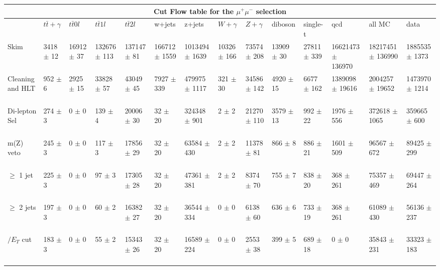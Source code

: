 \begin{table}
  \centering 
\resizebox{\columnwidth}{!} {

\begin{tabular}{|l|l|l|l|l|l|l|l|l|l|l|l|l|l|}
\hline
\multicolumn{14}{|c|}{\textbf{Cut Flow table for the $\mu^+\mu^-$ selection}} \\
\hline
 & $t\bar{t}+\gamma$ & $t\bar{t} 0l$ & $t\bar{t} 1l$ & $t\bar{t} 2l$ & w+jets & z+jets & $W+\gamma$ & $Z+\gamma$ & diboson & single-t & qcd & all MC & data \\
 \hline
Skim & 3418 $\pm$ 12 \ & 16912 $\pm$ 37 \ & 132676 $\pm$ 113 \ & 137147 $\pm$ 81 \ & 166712 $\pm$ 1559 \ & 1013494 $\pm$ 1639 \ & 10326 $\pm$ 166 \ & 73574 $\pm$ 208 \ & 13909 $\pm$ 30 \ & 27811 $\pm$ 339 \ & 16621473 $\pm$ 136970\ & 18217451 $\pm$ 136990 \ & 1885535 $\pm$ 1373 \\
Cleaning and HLT & 952 $\pm$ 6 \ & 2925 $\pm$ 15 \ & 33828 $\pm$ 57 \ & 43049 $\pm$ 45 \ & 7927 $\pm$ 339 \ & 479975 $\pm$ 1117 \ & 321 $\pm$ 30 \ & 34586 $\pm$ 142 \ & 4920 $\pm$ 15 \ & 6677 $\pm$ 162 \ & 1389098 $\pm$ 19616\ & 2004257 $\pm$ 19652 \ & 1473970 $\pm$ 1214 \\
Di-lepton Sel & 274 $\pm$ 3 \ & 0 $\pm$ 0 \ & 139 $\pm$ 4 \ & 20006 $\pm$ 30 \ & 32 $\pm$ 20 \ & 324348 $\pm$ 901 \ & 2 $\pm$ 2 \ & 21270 $\pm$ 110 \ & 3579 $\pm$ 13 \ & 992 $\pm$ 22 \ & 1976 $\pm$ 556\ & 372618 $\pm$ 1065 \ & 359665 $\pm$ 600 \\
m(Z) veto & 245 $\pm$ 3 \ & 0 $\pm$ 0 \ & 117 $\pm$ 3 \ & 17856 $\pm$ 29 \ & 32 $\pm$ 20 \ & 63584 $\pm$ 430 \ & 2 $\pm$ 2 \ & 11378 $\pm$ 81 \ & 866 $\pm$ 8 \ & 886 $\pm$ 21 \ & 1601 $\pm$ 509\ & 96567 $\pm$ 672 \ & 89425 $\pm$ 299 \\
$\geq$ 1 jet & 225 $\pm$ 3 \ & 0 $\pm$ 0 \ & 97 $\pm$ 3 \ & 17305 $\pm$ 28 \ & 32 $\pm$ 20 \ & 47361 $\pm$ 381 \ & 2 $\pm$ 2 \ & 8374 $\pm$ 70 \ & 755 $\pm$ 7 \ & 838 $\pm$ 20 \ & 368 $\pm$ 261\ & 75357 $\pm$ 469 \ & 69447 $\pm$ 264 \\
$\geq$ 2 jets & 197 $\pm$ 3 \ & 0 $\pm$ 0 \ & 60 $\pm$ 2 \ & 16382 $\pm$ 27 \ & 32 $\pm$ 20 \ & 36544 $\pm$ 334 \ & 0 $\pm$ 0 \ & 6138 $\pm$ 60 \ & 636 $\pm$ 6 \ & 733 $\pm$ 19 \ & 368 $\pm$ 261\ & 61089 $\pm$ 430 \ & 56136 $\pm$ 237 \\
$\slash{E_{T}}$ cut & 183 $\pm$ 3 \ & 0 $\pm$ 0 \ & 55 $\pm$ 2 \ & 15343 $\pm$ 26 \ & 32 $\pm$ 20 \ & 16589 $\pm$ 224 \ & 0 $\pm$ 0 \ & 2553 $\pm$ 38 \ & 399 $\pm$ 5 \ & 689 $\pm$ 18 \ & 0 $\pm$ 0\ & 35843 $\pm$ 231 \ & 33323 $\pm$ 183 \\

\end{tabular}}
\end{table}
